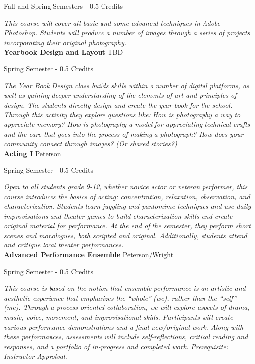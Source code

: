 \noindent Fall and Spring Semesters - 0.5 Credits

\vspace{1mm}\emph{This course will cover all basic and some advanced techniques in Adobe Photoshop. Students will produce a number of images through a series of projects incorporating their original photography.}\\

\noindent\textbf{Yearbook Design and Layout} \hfill TBD

\noindent Spring Semester - 0.5 Credits

\vspace{1mm}\emph{The Year Book Design class builds skills within a number of digital platforms, as well as gaining deeper understanding of the elements of art and principles of design. The students directly design and create the year book for the school. Through this activity they explore questions like: How is photography a way to appreciate memory? How is photography a model for appreciating technical crafts and the care that goes into the process of making a photograph? How does your community connect through images? (Or shared stories?)}\\

\noindent\textbf{Acting I} \hfill Peterson

\noindent Spring Semester - 0.5 Credits

\vspace{1mm}\emph{Open to all students grade 9-12, whether novice actor or veteran performer, this course introduces the basics of acting: concentration, relaxation, observation, and characterization. Students learn juggling and pantomime techniques and use daily improvisations and theater games to build characterization skills and create original material for performance. At the end of the semester, they perform short scenes and monologues, both scripted and original. Additionally, students attend and critique local theater performances.}\\

\noindent\textbf{Advanced Performance Ensemble} \hfill Peterson/Wright

\noindent Spring Semester - 0.5 Credits

\vspace{1mm}\emph{This course is based on the notion that ensemble performance is an artistic and aesthetic experience that emphasizes the “whole” (we), rather than the “self” (me). Through a process-oriented collaboration, we will explore aspects of drama, music, voice, movement, and improvisational skills. Participants will create various performance demonstrations and a final new/original work. Along with these performances, assessments will include self-reflections, critical reading and responses, and a portfolio of in-progress and completed work. Prerequisite: Instructor Approlval.}\\

